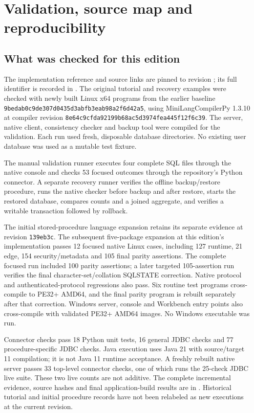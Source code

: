 \chapter{Validation, source map and reproducibility}
\label{appendix:validation}

\section{What was checked for this edition}
The implementation reference and source links are pinned to revision
\texttt{\SourceShort}; its full identifier is recorded in .
The original tutorial and recovery examples were
checked with newly built Linux x64 programs from the earlier baseline
\texttt{9bedab0c9de307d0435d3abfb3eab98a2f6d42a5}, using
MiniLangCompilerPy 1.3.10 at compiler revision
\texttt{8e64c9cfda92199b68ac5d3974fea445f12f6c39}.
The server, native client, consistency checker and backup tool were compiled
for the validation. Each run used fresh, disposable database directories.
No existing user database was used as a mutable test fixture.

The manual validation runner executes four complete SQL files through the
native console and checks 53 focused outcomes through the repository's Python
connector. A separate recovery runner verifies the offline backup/restore
procedure, runs the native checker before backup and after restore, starts
the restored database, compares counts and a joined aggregate, and verifies
a writable transaction followed by rollback.

The initial stored-procedure language expansion retains its separate evidence
at revision \texttt{139eb3c}. The subsequent five-package expansion at this
edition's implementation passes 12 focused native Linux cases, including
127 runtime, 21 edge, 154 security/metadata and 105 final parity assertions.
The complete focused run included 100 parity assertions; a later targeted
105-assertion run verifies the final character-set/collation SQLSTATE correction.
Native protocol and authenticated-protocol regressions also pass. Six routine
test programs cross-compile to PE32+ AMD64, and the final parity program is
rebuilt separately after that correction. Windows server, console and
Workbench entry points also cross-compile with validated PE32+ AMD64 images.
No Windows executable was run.

Connector checks pass 18 Python unit tests, 16 general JDBC checks and
77 procedure-specific JDBC checks. Java execution uses Java 21 with
source/target 11 compilation; it is not Java 11 runtime acceptance. A freshly
rebuilt native server passes 33 top-level connector checks, one of which runs
the 25-check JDBC live suite. These two live counts are not additive.
The complete incremental evidence, source hashes and final application-build
results are in .
Historical tutorial and initial procedure records have not been relabeled as
new executions at the current revision.

